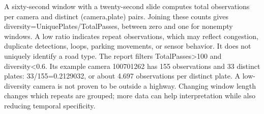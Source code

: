 \documentclass[11pt,a4paper]{article}
\begin{document}
A sixty-second window with a twenty-second slide computes total observations per camera and distinct (camera,plate) pairs. Joining these counts gives diversity=\allowbreak{}UniquePlates/\allowbreak{}TotalPasses, between zero and one for nonempty windows. A low ratio indicates repeat observations, which may reflect congestion, duplicate detections, loops, parking movements, or sensor behavior. It does not uniquely identify a road type. The report filters TotalPasses>100 and diversity<0.6. Its example camera 100701262 has 155 observations and 33 distinct plates:\allowbreak{} 33/\allowbreak{}155=\allowbreak{}0.2129032, or about 4.697 observations per distinct plate. A low-diversity camera is not proven to be outside a highway. Changing window length changes which repeats are grouped;\allowbreak{} more data can help interpretation while also reducing temporal specificity.
\end{document}
